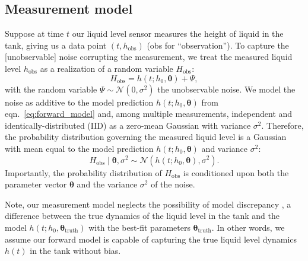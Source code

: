 \documentclass[openacc]{rsproca_new}%
\begin{document}
\subsection{Measurement model}
Suppose at time $t$ our liquid level sensor measures the height of liquid in the tank, giving us a data point $(t, h_{\text{obs}})$ (obs for ``observation''). 
To capture the [unobservable] noise corrupting the measurement, we treat the measured liquid level $h_{\text{obs}}$ as a realization of a random variable $H_{\text{obs}}$:
\begin{equation}
	H_{\text{obs}} = h(t; h_0, \boldsymbol \theta)  + \Psi,
\end{equation}
with the random variable $\Psi \sim \mathcal{N}(0, \sigma^2)$ the unobservable noise. 
We model the noise as additive to the model prediction $h(t; h_0, \boldsymbol \theta)$ from eqn.~\ref{eq:forward_model} and, among multiple measurements, independent and identically-distributed (IID) as a zero-mean Gaussian with variance $\sigma^2$. 
Therefore, the probability distribution governing the measured liquid level is a Gaussian with mean equal to the model prediction $h(t;h_0, \boldsymbol \theta)$ and variance $\sigma^2$:
\begin{equation}
	H_{\text{obs}} \mid \boldsymbol  \theta, \sigma^2 \sim \mathcal{N}(h(t; h_0, \boldsymbol \theta), \sigma^2). \label{eq:H_obs_distn}
\end{equation} Importantly, the probability distribution of $H_{\text{obs}}$ is conditioned upon both the parameter vector $\boldsymbol  \theta$ and the variance $\sigma^2$ of the noise.


Note, our measurement model neglects the possibility of model discrepancy \cite{brynjarsdottir2014learning,kennedy2001bayesian}, a difference between the true dynamics of the liquid level in the tank and the model $h(t; h_0, \boldsymbol \theta_{\text{truth}})$ with the best-fit parameters $\boldsymbol \theta_{\text{truth}}$. In other words, we assume our forward model is capable of capturing the true liquid level dynamics $h(t)$ in the tank without bias.
\end{document}
